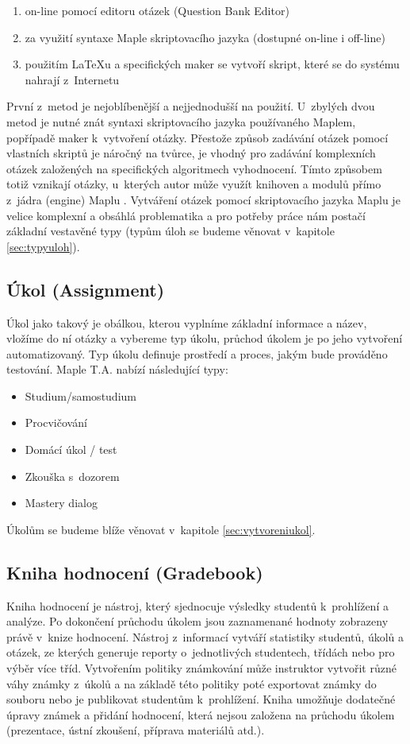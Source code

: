 \documentclass[
print,
  11pt,
  table,   
  nolof,    
  nolot,
  oneside,final
]{fithesis3}
\begin{document}
\begin{enumerate}
	\item on-line pomocí editoru otázek (Question Bank Editor)
	\item za využití syntaxe Maple skriptovacího jazyka (dostupné on-line i off-line)
	\item použitím LaTeXu a specifických maker se vytvoří skript, které se do systému nahrají z~Internetu
\end{enumerate}
První z~metod je nejoblíbenější a nejjednodušší na použití. U~zbylých dvou metod je nutné znát syntaxi skriptovacího jazyka používaného Maplem, popřípadě maker k~vytvoření otázky. Přestože způsob zadávání otázek pomocí vlastních skriptů je náročný na tvůrce, je vhodný pro zadávání komplexních otázek založených na specifických algoritmech vyhodnocení. Tímto způsobem totiž vznikají otázky, u~kterých autor může využít knihoven a modulů přímo z~jádra (engine) Maplu \cite{char}. Vytváření otázek pomocí skriptovacího jazyka Maplu je velice komplexní a obsáhlá problematika a pro potřeby práce nám postačí základní vestavěné typy (typům úloh se budeme věnovat v~kapitole \ref{sec:typyuloh}). 

		\subsection{Úkol (Assignment)}
Úkol jako takový je obálkou, kterou vyplníme základní informace a název, vložíme do ní otázky a vybereme typ úkolu, průchod úkolem je po jeho vytvoření automatizovaný. Typ úkolu definuje prostředí a proces, jakým bude prováděno testování. Maple T.A. nabízí následující typy:

\begin{itemize}
	\item Studium/samostudium
	\item Procvičování
	\item Domácí úkol / test
	\item Zkouška s~dozorem 
	\item Mastery dialog
\end{itemize}
Úkolům se budeme blíže věnovat v~kapitole \ref{sec:vytvoreniukol}.

	\subsection{Kniha hodnocení (Gradebook)}
Kniha hodnocení je nástroj, který sjednocuje výsledky studentů k~prohlížení a analýze. Po dokončení průchodu úkolem jsou zaznamenané hodnoty zobrazeny právě v~knize hodnocení. Nástroj z~informací vytváří statistiky studentů, úkolů a otázek, ze kterých generuje reporty o~jednotlivých studentech, třídách nebo pro výběr více tříd. Vytvořením politiky známkování může instruktor vytvořit různé váhy známky z~úkolů a na základě této politiky poté exportovat známky do souboru nebo je publikovat studentům k~prohlížení. Kniha umožňuje dodatečné úpravy známek a přidání hodnocení, která nejsou založena na průchodu úkolem (prezentace, ústní zkoušení, příprava materiálů atd.).
\end{document}
